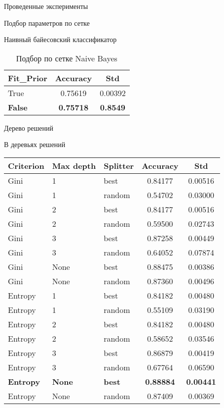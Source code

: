 \begin{section}{Проведенные эксперименты}
\begin{subsection}{Подбор параметров по сетке}
\begin{subsubsection}{Наивный байесовский классификатор}
\begin{table}[H]
\centering
{\begin{tabular}{|l|c|c|}
\hline
\textbf{Fit\_Prior} & \textbf{Accuracy} & \textbf{Std} \\
\hline
True & 0.75619  & 0.00392 \\
\hline
\textbf{False} & \textbf{0.75718}  & \textbf{0.8549} \\
\hline
\end{tabular}}

\caption{Подбор по сетке Naive Bayes}
\label{grid:nb}
\end{table}



\end{subsubsection}


\begin{subsubsection}{Дерево решений}

В деревьях решений


\begin{table}[H]
\centering
{\begin{tabular}{|l|l|l|c|c|}
\hline
\textbf{Criterion} & \textbf{Max depth} & \textbf{Splitter} & \textbf{Accuracy} & \textbf{Std} \\
\hline
Gini & 1  & best & 0.84177 & 0.00516 \\
\hline
Gini & 1  & random &  0.54702 & 0.03000 \\
\hline
Gini & 2  & best & 0.84177 & 0.00516 \\
\hline
Gini &  2 & random  & 0.59500 & 0.02743 \\
\hline
Gini & 3  & best & 0.87258 & 0.00449 \\
\hline
Gini & 3  & random & 0.64052 & 0.07874 \\
\hline
Gini & None  & best & 0.88475 & 0.00386 \\
\hline
Gini &  None & random  & 0.87360 & 0.00496 \\
\hline
Entropy & 1  & best & 0.84182 & 0.00480 \\
\hline
Entropy & 1  & random & 0.55109 & 0.03190 \\
\hline
Entropy  & 2  & best & 0.84182 & 0.00480 \\
\hline
Entropy  &  2 & random  & 0.58652 & 0.03546 \\
\hline
Entropy  & 3  & best &  0.86879 & 0.00419 \\
\hline
Entropy  & 3  & random & 0.67764 & 0.06590 \\
\hline
\textbf{Entropy} & \textbf{None}  & \textbf{best} & \textbf{0.88884} & \textbf{0.00441} \\
\hline
Entropy &  None & random  & 0.87409 & 0.00369 \\
\hline
\end{tabular}}


\end{table}
\end{subsubsection}
\end{subsection}
\end{section}
